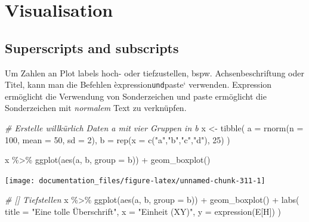 \documentclass[
]{article}
\newenvironment{Shaded}{\begin{snugshade}}{\end{snugshade}}
\newcommand{\AttributeTok}[1]{\textcolor[rgb]{0.77,0.63,0.00}{#1}}
\newcommand{\CommentTok}[1]{\textcolor[rgb]{0.56,0.35,0.01}{\textit{#1}}}
\newcommand{\DecValTok}[1]{\textcolor[rgb]{0.00,0.00,0.81}{#1}}
\newcommand{\FunctionTok}[1]{\textcolor[rgb]{0.00,0.00,0.00}{#1}}
\newcommand{\NormalTok}[1]{#1}
\newcommand{\OtherTok}[1]{\textcolor[rgb]{0.56,0.35,0.01}{#1}}
\newcommand{\SpecialCharTok}[1]{\textcolor[rgb]{0.00,0.00,0.00}{#1}}
\newcommand{\StringTok}[1]{\textcolor[rgb]{0.31,0.60,0.02}{#1}}
\begin{document}
\hypertarget{visualisation}{%
\section{Visualisation}\label{visualisation}}

\hypertarget{superscripts-and-subscripts}{%
\subsection{Superscripts and subscripts}\label{superscripts-and-subscripts}}

Um Zahlen an Plot labels hoch- oder tiefzustellen, bspw. Achsenbeschriftung oder Titel, kann man die Befehlen èxpression\texttt{und}paste` verwenden. Expression ermöglicht die Verwendung von Sonderzeichen und paste ermöglicht die Sonderzeichen mit \emph{normalem} Text zu verknüpfen.

\begin{Shaded}
\begin{Highlighting}[]
\CommentTok{\# Erstelle willkürlich Daten a mit vier Gruppen in b}
\NormalTok{x }\OtherTok{\textless{}{-}} \FunctionTok{tibble}\NormalTok{(}
  \AttributeTok{a =} \FunctionTok{rnorm}\NormalTok{(}\AttributeTok{n =} \DecValTok{100}\NormalTok{, }\AttributeTok{mean =} \DecValTok{50}\NormalTok{, }\AttributeTok{sd =} \DecValTok{2}\NormalTok{),}
  \AttributeTok{b =} \FunctionTok{rep}\NormalTok{(}\AttributeTok{x =} \FunctionTok{c}\NormalTok{(}\StringTok{"a"}\NormalTok{,}\StringTok{"b"}\NormalTok{,}\StringTok{"c"}\NormalTok{,}\StringTok{"d"}\NormalTok{), }\DecValTok{25}\NormalTok{)}
\NormalTok{)}

\NormalTok{x }\SpecialCharTok{\%\textgreater{}\%}
  \FunctionTok{ggplot}\NormalTok{(}\FunctionTok{aes}\NormalTok{(a, b, }\AttributeTok{group =}\NormalTok{ b)) }\SpecialCharTok{+}
  \FunctionTok{geom\_boxplot}\NormalTok{()}
\end{Highlighting}
\end{Shaded}

\begin{center}\texttt{[image: documentation\_files/figure-latex/unnamed-chunk-311-1]} \end{center}

\begin{Shaded}
\begin{Highlighting}[]

\CommentTok{\# [] Tiefstellen}
\NormalTok{x }\SpecialCharTok{\%\textgreater{}\%}
  \FunctionTok{ggplot}\NormalTok{(}\FunctionTok{aes}\NormalTok{(a, b, }\AttributeTok{group =}\NormalTok{ b)) }\SpecialCharTok{+}
  \FunctionTok{geom\_boxplot}\NormalTok{() }\SpecialCharTok{+}
  \FunctionTok{labs}\NormalTok{(}
    \AttributeTok{title =} \StringTok{"Eine tolle Überschrift"}\NormalTok{,}
    \AttributeTok{x =} \StringTok{"Einheit (XY)"}\NormalTok{,}
    \AttributeTok{y =} \FunctionTok{expression}\NormalTok{(E[H])}
\NormalTok{  )}
\end{Highlighting}
\end{Shaded}
\end{document}
